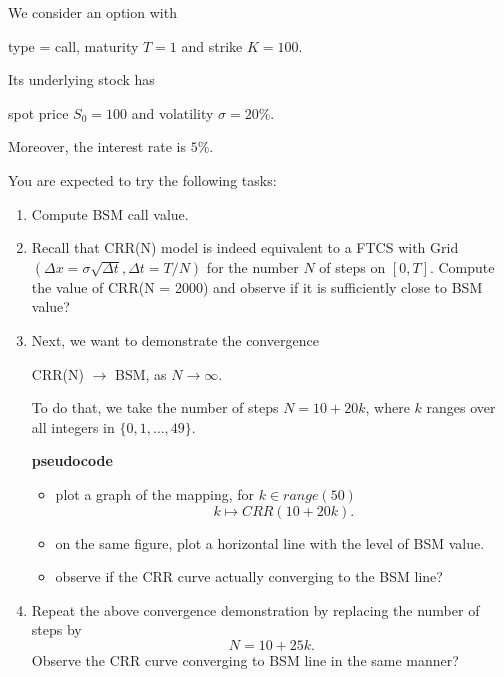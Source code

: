 \documentclass{article}
\begin{document}
\begin{center}
\end{center}

We consider an option with 
\begin{center}
 type = call, maturity $T = 1$ and strike $K = 100$.
\end{center}
Its underlying stock has 
\begin{center}
 spot price $S_{0} = 100$ and volatility $\sigma = 20\%$.
\end{center}
Moreover, the interest rate is $5\%$.

You are expected to try the following tasks:
\begin{enumerate}
 \item Compute BSM call value.
 \item Recall that CRR(N) model is indeed equivalent to a FTCS with
 Grid $(\Delta x = \sigma \sqrt{\Delta t}, \Delta t = T/N)$ for the number $N$ of steps on $[0,T]$. Compute the value of CRR(N = 2000) and observe if it is sufficiently close to BSM value?
 \item Next, we want to demonstrate the convergence 
\begin{center}
 CRR(N) $\to$ BSM, as $N\to \infty$.
\end{center} 
To do that, we take the number of steps 
$N = 10 + 20k$, where $k$ ranges over all integers in $\{0, 1, \ldots, 49\}$.

{\bf pseudocode} 
\begin{itemize}
\item plot a graph of the mapping, for $k \in range(50)$
$$k \mapsto CRR(10 + 20k).$$ 
\item on the same figure, plot a horizontal line with the level of BSM value.
\item observe if the CRR curve actually converging to the BSM line?
\end{itemize}

\item Repeat the above convergence demonstration by replacing the number of steps by
$$N = 10 + 25 k.$$
Observe the CRR curve converging to BSM line in the same manner?

\end{enumerate}


%
%
%
%
\end{document}
